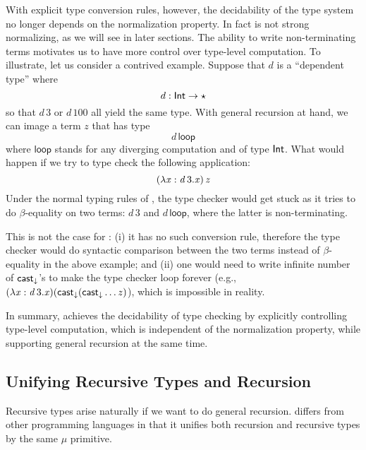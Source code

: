With explicit type conversion rules, however, the decidability of the type system no longer depends on the normalization property. In fact \name is not strong normalizing, as we will see in later sections. The ability to write non-terminating terms motivates us to have more control over type-level computation. To illustrate, let us consider a contrived example. Suppose that $d$ is a ``dependent type'' where \[d : \mathsf{Int}  \rightarrow  \star\] so that $d\,3$ or $d\,100$ all yield the same type.  With general recursion at hand, we can image  a term $z$ that has type \[d\,\mathsf{loop}\] where $\mathsf{loop}$ stands for any diverging computation and of type $ \mathsf{Int} $. What would happen if we try to type check the following application: \[ (  \lambda  \mathit{x}  :  \mathit{d} \, 3  .  \mathit{x}  ) \, \mathit{z}\] Under the normal typing rules of \coc, the type checker would get stuck as it tries to do $\beta$-equality on two terms: $d\,3$ and $d\,\mathsf{loop}$, where the latter is non-terminating.

This is not the case for \name: (i) it has no such conversion rule, therefore the type checker would do syntactic comparison between the two terms instead of $\beta$-equality in the above example; and (ii) one would need to write infinite number of $ \mathsf{cast}_{\downarrow} $'s to make the type checker loop forever (e.g., $(\lambda  \mathit{x}  :  \mathit{d} \, 3  .  \mathit{x})( \mathsf{cast}_{\downarrow} ( \mathsf{cast}_{\downarrow}  \dots z) $), which is impossible in reality.

In summary, \name achieves the decidability of type checking by explicitly controlling type-level computation, which is independent of the normalization property, while supporting general recursion at the same time.

\subsection{Unifying Recursive Types and Recursion}


Recursive types arise naturally if we want to do general recursion. \name differs from other programming languages in that it unifies both recursion and recursive types by the same $\mu$ primitive.

